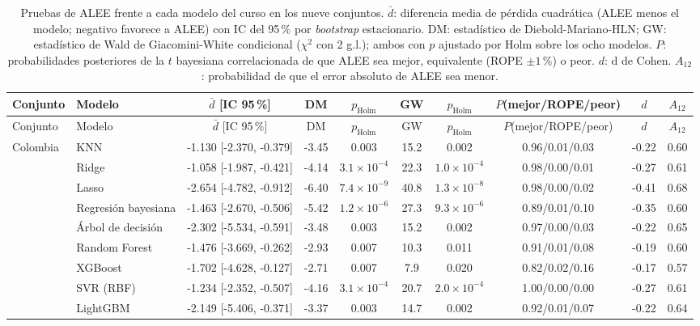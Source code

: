 \begin{longtable}{llcccccccc}
\caption{Pruebas de ALEE frente a cada modelo del curso en los nueve conjuntos. $\bar d$: diferencia media de pérdida cuadrática (ALEE menos el modelo; negativo favorece a ALEE) con IC del 95\,\% por \textit{bootstrap} estacionario. DM: estadístico de Diebold-Mariano-HLN; GW: estadístico de Wald de Giacomini-White condicional ($\chi^2$ con 2 g.l.); ambos con $p$ ajustado por Holm sobre los ocho modelos. $P$: probabilidades posteriores de la $t$ bayesiana correlacionada de que ALEE sea mejor, equivalente (ROPE $\pm1$\,\%) o peor. $d$: d de Cohen. $A_{12}$: probabilidad de que el error absoluto de ALEE sea menor.}\label{tab:pruebas}\\
\toprule
Conjunto & Modelo & $\bar d$ [IC 95\,\%] & DM & $p_{\mathrm{Holm}}$ & GW & $p_{\mathrm{Holm}}$ & $P$(mejor/ROPE/peor) & $d$ & $A_{12}$ \\
\midrule
\endfirsthead
\toprule
Conjunto & Modelo & $\bar d$ [IC 95\,\%] & DM & $p_{\mathrm{Holm}}$ & GW & $p_{\mathrm{Holm}}$ & $P$(mejor/ROPE/peor) & $d$ & $A_{12}$ \\
\midrule
\endhead
\bottomrule
\endfoot
Colombia & KNN & -1.130 [-2.370, -0.379] & -3.45 & 0.003 & 15.2 & 0.002 & 0.96/0.01/0.03 & -0.22 & 0.60 \\
 & Ridge & -1.058 [-1.987, -0.421] & -4.14 & $3.1\times10^{-4}$ & 22.3 & $1.0\times10^{-4}$ & 0.98/0.00/0.01 & -0.27 & 0.61 \\
 & Lasso & -2.654 [-4.782, -0.912] & -6.40 & $7.4\times10^{-9}$ & 40.8 & $1.3\times10^{-8}$ & 0.98/0.00/0.02 & -0.41 & 0.68 \\
 & Regresión bayesiana & -1.463 [-2.670, -0.506] & -5.42 & $1.2\times10^{-6}$ & 27.3 & $9.3\times10^{-6}$ & 0.89/0.01/0.10 & -0.35 & 0.60 \\
 & Árbol de decisión & -2.302 [-5.534, -0.591] & -3.48 & 0.003 & 15.2 & 0.002 & 0.97/0.00/0.03 & -0.22 & 0.65 \\
 & Random Forest & -1.476 [-3.669, -0.262] & -2.93 & 0.007 & 10.3 & 0.011 & 0.91/0.01/0.08 & -0.19 & 0.60 \\
 & XGBoost & -1.702 [-4.628, -0.127] & -2.71 & 0.007 & 7.9 & 0.020 & 0.82/0.02/0.16 & -0.17 & 0.57 \\
 & SVR (RBF) & -1.234 [-2.352, -0.507] & -4.16 & $3.1\times10^{-4}$ & 20.7 & $2.0\times10^{-4}$ & 1.00/0.00/0.00 & -0.27 & 0.61 \\
 & LightGBM & -2.149 [-5.406, -0.371] & -3.37 & 0.003 & 14.7 & 0.002 & 0.92/0.01/0.07 & -0.22 & 0.64 \\

\end{longtable}
